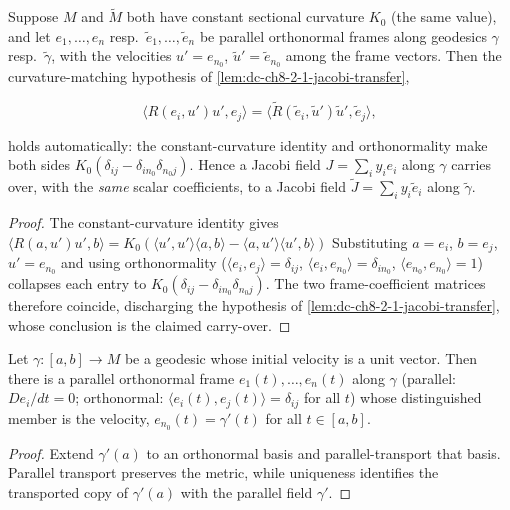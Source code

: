 \begin{lemma}
  \label{lem:dc-ch8-2-1-jacobi-transfer-const}


  Suppose $M$ and $\tilde M$ both have constant sectional curvature $K_0$ (the same value),
  and let $e_1,\dots,e_n$ resp.\ $\tilde e_1,\dots,\tilde e_n$ be parallel orthonormal frames
  along geodesics $\gamma$ resp.\ $\tilde\gamma$, with the velocities $u'=e_{n_0}$,
  $\tilde u'=\tilde e_{n_0}$ among the frame vectors. Then the curvature-matching hypothesis
  of \cref{lem:dc-ch8-2-1-jacobi-transfer},

  $$
  \langle R(e_i,u')u',e_j\rangle=\langle\tilde R(\tilde e_i,\tilde u')\tilde u',\tilde e_j\rangle,
  $$

  holds automatically: the constant-curvature identity and orthonormality make both sides
  $K_0(\delta_{ij}-\delta_{i n_0}\delta_{n_0 j})$. Hence a Jacobi field $J=\sum_i y_i e_i$ along
  $\gamma$ carries over, with the \emph{same} scalar coefficients, to a Jacobi field
  $\tilde J=\sum_i y_i\tilde e_i$ along $\tilde\gamma$.
\end{lemma}
\begin{proof}

\sketch
  The constant-curvature identity gives
  $\langle R(a,u')u',b\rangle=K_0(\langle u',u'\rangle\langle a,b\rangle-\langle a,u'\rangle\langle u',b\rangle)$
  Substituting
  $a=e_i$, $b=e_j$, $u'=e_{n_0}$ and using orthonormality
  ($\langle e_i,e_j\rangle=\delta_{ij}$, $\langle e_i,e_{n_0}\rangle=\delta_{i n_0}$,
  $\langle e_{n_0},e_{n_0}\rangle=1$) collapses each entry to
  $K_0(\delta_{ij}-\delta_{i n_0}\delta_{n_0 j})$. The two frame-coefficient
  matrices therefore coincide, discharging the hypothesis of
  \cref{lem:dc-ch8-2-1-jacobi-transfer}, whose conclusion is the claimed carry-over.
\end{proof}

\begin{lemma}
  \label{lem:dc-ch8-2-1-velocity-frame}


  Let $\gamma:[a,b]\to M$ be a geodesic whose initial velocity is a unit vector. Then there is a parallel
  orthonormal frame $e_1(t),\dots,e_n(t)$ along $\gamma$ (parallel: $De_i/dt=0$; orthonormal:
  $\langle e_i(t),e_j(t)\rangle=\delta_{ij}$ for all $t$) whose distinguished member is the
  velocity, $e_{n_0}(t)=\gamma'(t)$ for all $t\in[a,b]$.
\end{lemma}
\begin{proof}

\sketch
  Extend $\gamma'(a)$ to an orthonormal basis and parallel-transport that basis.
  Parallel transport preserves the metric, while uniqueness identifies the transported
  copy of $\gamma'(a)$ with the parallel field $\gamma'$.
\end{proof}

